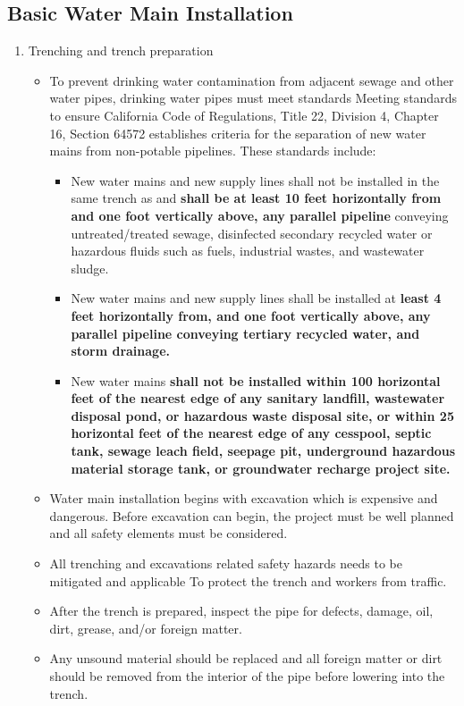 \subsection{Basic Water Main Installation} 
\begin{enumerate}
\item Trenching and trench preparation
\begin{itemize}
\item To prevent drinking water contamination from adjacent sewage and other water pipes, drinking water pipes must meet standards Meeting standards to ensure California Code of Regulations, Title 22,
Division 4, Chapter 16, Section 64572 establishes criteria for the separation of new water mains from non-potable pipelines. These standards include:
\begin{itemize}
\item New water mains and new supply lines shall not be installed in the same trench as and \textbf{shall be at least 10 feet horizontally from and one foot vertically above, any parallel pipeline} conveying untreated/treated sewage, disinfected secondary recycled water or hazardous fluids such as fuels, industrial wastes, and wastewater sludge.
\item New water mains and new supply lines shall be installed at \textbf{least 4 feet horizontally from, and one foot vertically above, any parallel pipeline conveying tertiary recycled water, and storm drainage.}
\item New water mains \textbf{shall not be installed within 100 horizontal feet of the nearest edge of any sanitary landfill, wastewater disposal pond, or hazardous waste disposal site, or within 25 horizontal feet of the nearest edge of any cesspool, septic tank, sewage leach field, seepage pit, underground hazardous material storage tank, or groundwater recharge project site.}
\end{itemize}
\item Water main installation begins with excavation which is expensive and dangerous.  Before excavation can begin, the project must be well planned and all safety elements must be considered.
\item All trenching and excavations related safety hazards needs to be mitigated and applicable  To protect the trench and workers from traffic.
\item After the trench is prepared, inspect the pipe for defects, damage, oil, dirt, grease, and/or foreign matter.
\item Any unsound material should be replaced and all foreign matter or dirt should be removed from the interior of the pipe before lowering into the trench.

\end{itemize}
\end{enumerate}
